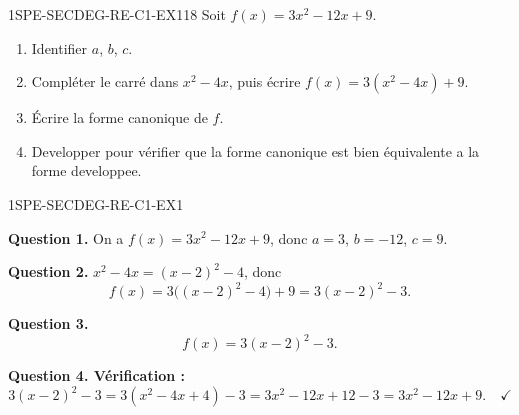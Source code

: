 


\begin{exercice}{1SPE-SECDEG-RE-C1-EX1}{1}{8}
Soit $f(x) = 3x^2 - 12x + 9$.
\begin{enumerate}
  \item Identifier $a$, $b$, $c$.
  \item Compléter le carré dans $x^2-4x$, puis écrire $f(x)=3(x^2-4x)+9$.
  \item Écrire la forme canonique de $f$.
  \item Developper pour vérifier que la forme canonique est bien équivalente a la forme developpee.
\end{enumerate}
\end{exercice}


\begin{corrige}{1SPE-SECDEG-RE-C1-EX1}


\textbf{Question 1.} On a $f(x) = 3x^2 - 12x + 9$, donc $a = 3$, $b = -12$, $c = 9$.


\textbf{Question 2.} $x^2-4x=(x-2)^2-4$, donc
\[
 f(x)=3\bigl((x-2)^2-4\bigr)+9=3(x-2)^2-3.
\]


\textbf{Question 3.}
\[
f(x) = 3(x - 2)^2 - 3.
\]

\textbf{Question 4. Vérification :}
\[
3(x-2)^2 - 3 = 3(x^2 - 4x + 4) - 3 = 3x^2 - 12x + 12 - 3 = 3x^2 - 12x + 9. \quad \checkmark
\]

\end{corrige}

